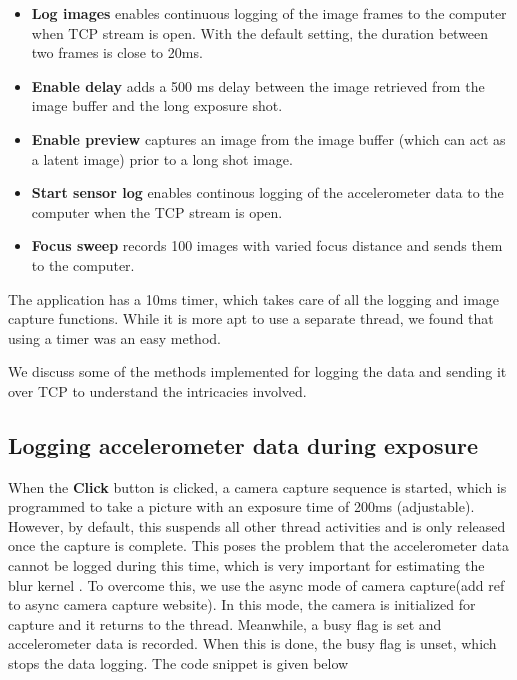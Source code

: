\documentclass[BTech]{iitmdiss}
\begin{document}
\begin{itemize}
    \item \textbf{Log images} enables continuous logging of the image 
    frames to the computer when TCP stream is open. With the default
    setting, the duration between two frames is close to 20ms.
    \item \textbf{Enable delay} adds a 500 ms delay between the image
    retrieved from the image buffer and the long exposure shot.
    \item \textbf{Enable preview} captures an image from the image buffer
    (which can act as a latent image) prior to a long shot image. 
    \item \textbf{Start sensor log} enables continous logging of the 
    accelerometer data to the computer when the TCP stream is open. 
    \item \textbf{Focus sweep} records 100 images with varied focus 
    distance and sends them to the computer.
\end{itemize}

The application has a 10ms timer, which takes care of all the logging 
and image capture functions. While it is more apt to use a separate 
thread, we found that using a timer was an easy method. 

We discuss some of the methods implemented for logging the data and 
sending it over TCP to understand the intricacies involved.

\subsection{Logging accelerometer data during exposure}
\label{device:device_app:cam}
When the \textbf{Click} button is clicked, a camera capture sequence
is started, which is programmed to take a picture with an exposure time
of 200ms (adjustable). However, by default, this suspends all other 
thread activities and is only released once the capture is complete. 
This poses the problem that the accelerometer data cannot be logged 
during this time, which is very important for estimating the blur kernel
. To overcome this, we use the async mode of camera capture(add ref to
async camera capture website). In this mode, the camera is initialized
for capture and it returns to the thread. Meanwhile, a busy flag is set
and accelerometer data is recorded. When this is done, the busy flag is
unset, which stops the data logging. The code snippet is given below
\end{document}
